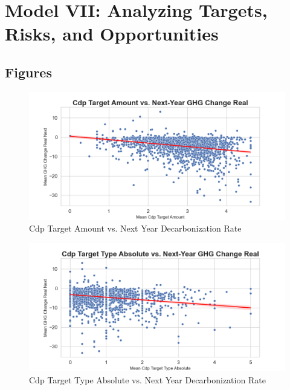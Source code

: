 \begin{itemize}
\end{itemize}


\section{Model VII: Analyzing Targets, Risks, and Opportunities}



\subsection{Figures}

\begin{figure}[H]
\centering
  \includegraphics[width=\textwidth]{figures/cdp_target_amount_vs_ghg_change_real_next.png}
\caption{Cdp Target Amount vs. Next Year Decarbonization Rate}
\label{fig:cdp_target_amount_vs_ghg_change_real_next}
\end{figure}

\begin{figure}[H]
\centering
  \includegraphics[width=\textwidth]{figures/cdp_target_type_absolute_vs_ghg_change_real_next.png}
\caption{Cdp Target Type Absolute vs. Next Year Decarbonization Rate}
\label{fig:cdp_target_type_absolute_vs_ghg_change_real_next}
\end{figure}

